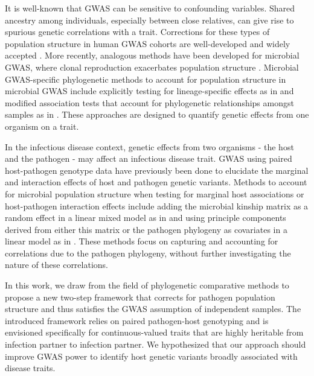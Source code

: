 \documentclass[11pt]{article}
\begin{document}
\begin{linenumbers}
It is well-known that GWAS can be sensitive to confounding variables. Shared ancestry among individuals, especially between close relatives, can give rise to spurious genetic correlations with a trait. Corrections for these types of population structure in human GWAS cohorts are well-developed and widely accepted  \citep{Astle2009, Price2006}. More recently, analogous methods have been developed for microbial GWAS, where clonal reproduction exacerbates population structure \citep{Power2017}. Microbial GWAS-specific phylogenetic methods to account for population structure in microbial GWAS include explicitly testing for lineage-specific effects as in \cite{Earle2016} and modified association tests that account for phylogenetic relationships amongst samples as in \cite{collins_phylogenetic_nodate}. 
These approaches are designed to quantify genetic effects from one organism on a trait. 

In the infectious disease context, genetic effects from two organisms - the host and the pathogen - may affect an infectious disease trait. GWAS using paired host-pathogen genotype data have previously been done to elucidate the marginal and interaction effects of host and pathogen genetic variants. Methods to account for microbial population structure when testing for marginal host associations or host-pathogen interaction effects include adding the microbial kinship matrix as a random effect in a linear mixed model as in \cite{Wang2018Two-wayGenomes} and using principle components derived from either this matrix or the pathogen phylogeny as covariates in a linear model as in \cite{Naret2018}. These methods focus on capturing and accounting for correlations due to the pathogen phylogeny, without further investigating the nature of these correlations.

In this work, we draw from the field of phylogenetic comparative methods to propose a new two-step framework that corrects for pathogen population structure and thus satisfies the GWAS assumption of independent samples. 
The introduced framework relies on paired pathogen-host genotyping and is envisioned specifically for continuous-valued traits that are highly heritable from infection partner to infection partner.
We hypothesized that our approach should improve GWAS power to identify host genetic variants broadly associated with disease traits.


\end{linenumbers}
\end{document}
